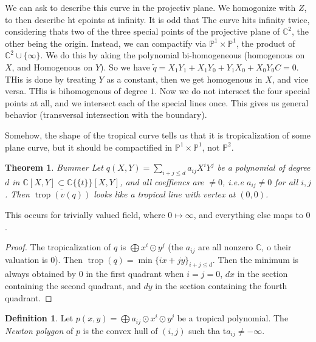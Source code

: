 \documentclass[12pt]{memoir}
\newtheorem{prototheorem}{Theorem}[section]
\newenvironment{theorem}
   {\begin{prototheorem}}
   {\end{prototheorem}}
\theoremstyle{definition}
\newtheorem{protodefinition}{Definition}[section]
\newenvironment{define}
   {\begin{protodefinition}}
   {\end{protodefinition}}
\def\CC{{\mathbb C}}
\def\PP{{\mathbb P}}
\DeclareMathOperator{\trop}{trop}
\begin{document}
We can ask to describe this curve in the projectiv plane. We homogonize with $Z$, to then describe ht epoints at infinity. It is odd that The curve hits infinity twice, considering thats two of the three special points of the projective plane of $\CC^2$, the other being the origin. Instead, we can compactify via $\PP^1\times \PP^1$, the product of $\CC^2\cup \{\infty\}$. We do this by aking the polynomial bi-homogeneous (homogenous on $X$, and Homogenous on $Y$). So we have $\tilde{q} = X_1Y_1 +X_1Y_0+Y_1X_0 + X_0Y_0C = 0$. THis is done by treating $Y$ as a constant, then we get homogenous in $X$, and vice versa. THis is bihomogenous of degree $1$. Now we do not intersect the four special points at all, and we intersect each of the special lines once. This gives us general behavior (transversal intersection with the boundary).

Somehow, the shape of the tropical curve tells us that it is tropicalization of some plane curve, but it should be compactified in $\PP^1\times \PP^1$, not $\PP^2$.





\begin{theorem}{Bummer}
    Let $q(X,Y)= \sum\limits_{i+j\leq d}a_{ij}X^iY^j$ be a polynomial of degree $d$ in $\CC[X,Y] \subset \CC\{\{t\}\} [X,Y]$, and all coeffiencs are $\neq 0$, i.e.e $a_{ij} \neq 0$ for all $i,j$. Then $\overline{\trop(v(q))}$ looks like a tropical line with vertex at $(0,0)$. 
\end{theorem}

This occurs for trivially valued field, where $0 \mapsto \infty$, and everything else maps to $0$.


\begin{proof}
    The tropicalization of $q$ is $\bigoplus x^i\odot y^j$ (the $a_{ij}$ are all nonzero $\CC$, o their valuation is $0$). Then $\trop(q) = \min\{ix+jy\}_{i+j\leq d}$. Then the minimum is always obtained by $0$ in the first quadrant when $i=j=0$, $dx$ in the section containing the second quadrant, and $dy$ in the section containing the fourth quadrant.
\end{proof}



\begin{define}
    Let $p(x,y) = \bigoplus a_{ij} \odot x^i\odot y^j$ be a tropical polynomial. The \emph{Newton polygon} of $p$ is the convex hull of $(i,j)$ such tha t$a_{ij} \neq - \infty$.
\end{define}
\end{document}
